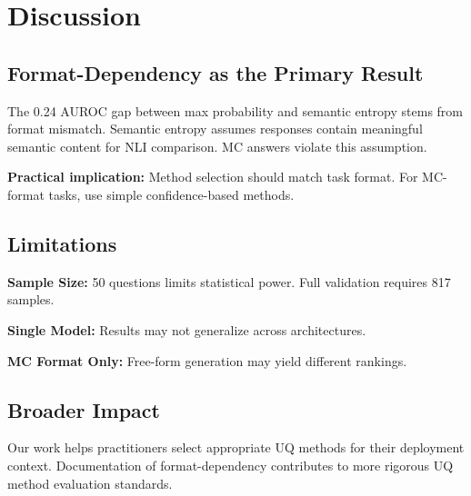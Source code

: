 \section{Discussion}
\label{sec:discussion}

\subsection{Format-Dependency as the Primary Result}

The 0.24 AUROC gap between max probability and semantic entropy stems from format mismatch. Semantic entropy assumes responses contain meaningful semantic content for NLI comparison. MC answers violate this assumption.

\textbf{Practical implication:} Method selection should match task format. For MC-format tasks, use simple confidence-based methods.

\subsection{Limitations}

\textbf{Sample Size:} 50 questions limits statistical power. Full validation requires 817 samples.

\textbf{Single Model:} Results may not generalize across architectures.

\textbf{MC Format Only:} Free-form generation may yield different rankings.

\subsection{Broader Impact}

Our work helps practitioners select appropriate UQ methods for their deployment context. Documentation of format-dependency contributes to more rigorous UQ method evaluation standards.
